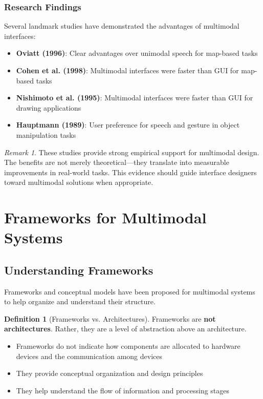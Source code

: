 \documentclass[11pt,a4paper]{article}
\theoremstyle{definition}
\newtheorem{definition}{Definition}[section]
\theoremstyle{plain}
\theoremstyle{remark}
\newtheorem*{remark}{Remark}
\begin{document}
\subsubsection{Research Findings}

Several landmark studies have demonstrated the advantages of multimodal interfaces:

\begin{itemize}
    \item \textbf{Oviatt (1996)}: Clear advantages over unimodal speech for map-based tasks
    
    \item \textbf{Cohen et al. (1998)}: Multimodal interfaces were faster than GUI for map-based tasks
    
    \item \textbf{Nishimoto et al. (1995)}: Multimodal interfaces were faster than GUI for drawing applications
    
    \item \textbf{Hauptmann (1989)}: User preference for speech and gesture in object manipulation tasks
\end{itemize}

\begin{remark}
These studies provide strong empirical support for multimodal design. The benefits are not merely theoretical—they translate into measurable improvements in real-world tasks. This evidence should guide interface designers toward multimodal solutions when appropriate.
\end{remark}

\section{Frameworks for Multimodal Systems}

\subsection{Understanding Frameworks}

Frameworks and conceptual models have been proposed for multimodal systems to help organize and understand their structure.

\begin{definition}[Frameworks vs. Architectures]
Frameworks are \textbf{not architectures}. Rather, they are a level of abstraction above an architecture.
\begin{itemize}
    \item Frameworks do not indicate how components are allocated to hardware devices and the communication among devices
    \item They provide conceptual organization and design principles
    \item They help understand the flow of information and processing stages
\end{itemize}
\end{definition}
\end{document}
